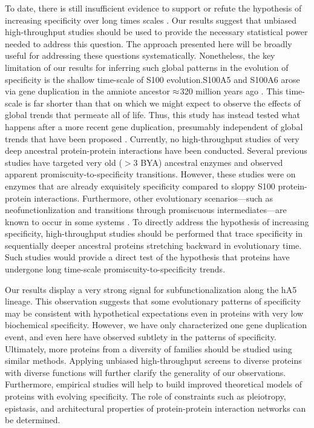 To date, there is still insufficient evidence to support or refute
the hypothesis of increasing specificity over long times scales \citep{wheeler_thermostability_2016}.
Our results suggest that unbiased high-throughput studies should be
used to provide the necessary statistical power needed to address
this question. The approach presented here will be broadly useful
for addressing these questions systematically. Nonetheless, the key
limitation of our results for inferring such global patterns in the
evolution of specificity is the shallow time-scale of S100 evolution.S100A5
and S100A6 arose via gene duplication in the amniote ancestor $\text{\ensuremath{\approx}}$320
million years ago \citep{zimmer_evolution_2013,wheeler_multiple_2016,wheeler_conservation_2017}.
This time-scale is far shorter than that on which we might expect
to observe the effects of global trends that permeate all of life.
Thus, this study has instead tested what happens after a more recent
gene duplication, presumably independent of global trends that have
been proposed \citep{jensen_enzyme_1976,copley_toward_2012,wheeler_thermostability_2016}.
Currently, no high-throughput studies of very deep ancestral protein-protein
interactions have been conducted. Several previous studies have targeted
very old ($>$3 BYA) ancestral enzymes and observed apparent promiscuity-to-specificity
transitions. However, these studies were on enzymes that are already
exquisitely specificity compared to sloppy S100 protein-protein interactions.
Furthermore, other evolutionary scenarios---such as neofunctionlization
and transitions through promiscuous intermediates---are known to occur
in some systems \citep{boucher_atomic-resolution_2014,howard_ancestral_2014,sayou_promiscuous_2014,aakre_evolving_2015,steindel_gradual_2016}.
To directly address the hypothesis of increasing specificity, high-throughput
studies should be performed that trace specificity in sequentially
deeper ancestral proteins stretching backward in evolutionary time.
Such studies would provide a direct test of the hypothesis that proteins
have undergone long time-scale promiscuity-to-specificity trends. 

Our results display a very strong signal for subfunctionalization
along the hA5 lineage. This observation suggests that some evolutionary
patterns of specificity may be consistent with hypothetical expectations
even in proteins with very low biochemical specificity. However, we
have only characterized one gene duplication event, and even here
have observed subtlety in the patterns of specificity. Ultimately,
more proteins from a diversity of families should be studied using
similar methods. Applying unbiased high-throughput screens to diverse
proteins with diverse functions will further clarify the generality
of our observations. Furthermore, empirical studies will help to build
improved theoretical models of proteins with evolving specificity.
The role of constraints such as pleiotropy, epistasis, and architectural
properties of protein-protein interaction networks can be determined. 

